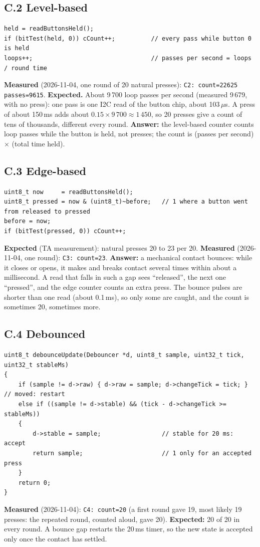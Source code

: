 \documentclass[11pt,a4paper]{article}
\begin{document}
\subsection*{C.2 Level-based}
\begin{lstlisting}
held = readButtonsHeld();
if (bitTest(held, 0)) cCount++;          // every pass while button 0 is held
loops++;                                 // passes per second = loops / round time
\end{lstlisting}
\textbf{Measured} (2026-11-04, one round of 20 natural presses): \texttt{C2: count=22625 passes=9615}.
\textbf{Expected.} About 9\,700 loop passes per second (measured 9\,679, with no press): one pass is one I2C read of
the button chip, about 103\,$\mu$s. A press of about 150\,ms adds about $0.15 \times 9\,700 \approx 1\,450$, so 20
presses give a count of tens of thousands, different every round. \textbf{Answer:} the level-based counter counts loop
passes while the button is held, not presses; the count is (passes per second) $\times$ (total time held).

\subsection*{C.3 Edge-based}
\begin{lstlisting}
uint8_t now     = readButtonsHeld();
uint8_t pressed = now & (uint8_t)~before;   // 1 where a button went from released to pressed
before = now;
if (bitTest(pressed, 0)) cCount++;
\end{lstlisting}
\textbf{Expected} (TA measurement): natural presses 20 to 23 per 20. \textbf{Measured} (2026-11-04, one round):
\texttt{C3: count=23}.
\textbf{Answer:} a mechanical contact bounces: while it closes or opens, it makes and breaks contact several times
within about a millisecond. A read that falls in such a gap sees ``released'', the next one ``pressed'', and the edge
counter counts an extra press. The bounce pulses are shorter than one read (about 0.1\,ms), so only some are caught,
and the count is sometimes 20, sometimes more.

\subsection*{C.4 Debounced}
\begin{lstlisting}
uint8_t debounceUpdate(Debouncer *d, uint8_t sample, uint32_t tick, uint32_t stableMs)
{
    if (sample != d->raw) { d->raw = sample; d->changeTick = tick; }      // moved: restart
    else if ((sample != d->stable) && (tick - d->changeTick >= stableMs))
    {
        d->stable = sample;                 // stable for 20 ms: accept
        return sample;                      // 1 only for an accepted press
    }
    return 0;
}
\end{lstlisting}
\textbf{Measured} (2026-11-04): \texttt{C4: count=20} (a first round gave 19, most likely 19 presses: the
repeated round, counted aloud, gave 20). \textbf{Expected:} 20 of 20 in every round. A bounce gap restarts the 20\,ms timer, so the new state is accepted only
once the contact has settled.
\end{document}
